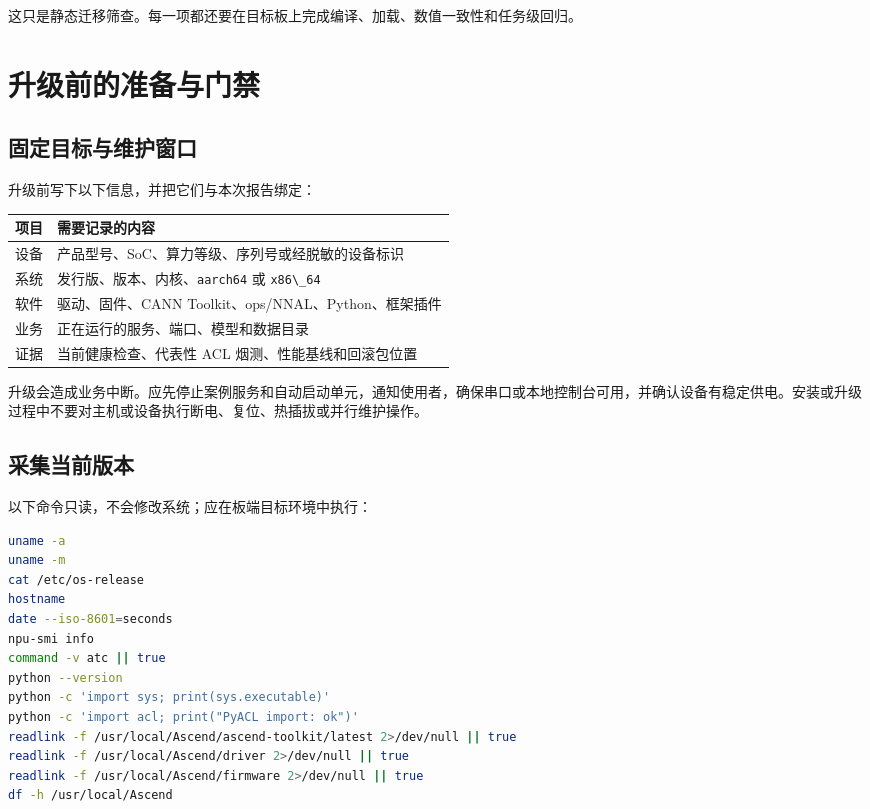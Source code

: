 这只是静态迁移筛查。每一项都还要在目标板上完成编译、加载、数值一致性和任务级回归。

\section{升级前的准备与门禁}\label{ux5347ux7ea7ux524dux7684ux51c6ux5907ux4e0eux95e8ux7981}

\subsection{固定目标与维护窗口}\label{ux56faux5b9aux76eeux6807ux4e0eux7ef4ux62a4ux7a97ux53e3}

升级前写下以下信息，并把它们与本次报告绑定：

\begin{longtable}[]{@{}ll@{}}
\toprule\noalign{}
项目 & 需要记录的内容 \\
\midrule\noalign{}
\endhead
\bottomrule\noalign{}
\endlastfoot
设备 & 产品型号、SoC、算力等级、序列号或经脱敏的设备标识 \\
系统 & 发行版、版本、内核、\passthrough{\lstinline!aarch64!} 或
\passthrough{\lstinline!x86\_64!} \\
软件 & 驱动、固件、CANN Toolkit、ops/NNAL、Python、框架插件 \\
业务 & 正在运行的服务、端口、模型和数据目录 \\
证据 & 当前健康检查、代表性 ACL 烟测、性能基线和回滚包位置 \\
\end{longtable}

升级会造成业务中断。应先停止案例服务和自动启动单元，通知使用者，确保串口或本地控制台可用，并确认设备有稳定供电。安装或升级过程中不要对主机或设备执行断电、复位、热插拔或并行维护操作。

\subsection{采集当前版本}\label{ux91c7ux96c6ux5f53ux524dux7248ux672c}

以下命令只读，不会修改系统；应在板端目标环境中执行：

\begin{lstlisting}[language=bash]
uname -a
uname -m
cat /etc/os-release
hostname
date --iso-8601=seconds
npu-smi info
command -v atc || true
python --version
python -c 'import sys; print(sys.executable)'
python -c 'import acl; print("PyACL import: ok")'
readlink -f /usr/local/Ascend/ascend-toolkit/latest 2>/dev/null || true
readlink -f /usr/local/Ascend/driver 2>/dev/null || true
readlink -f /usr/local/Ascend/firmware 2>/dev/null || true
df -h /usr/local/Ascend
\end{lstlisting}

